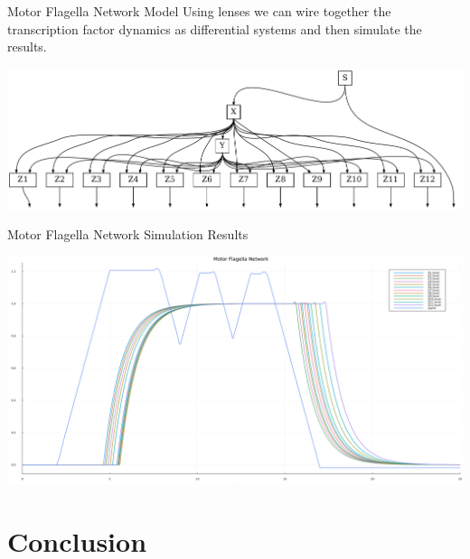 \documentclass{beamer}
\begin{document}
\begin{frame}{Motor Flagella Network Model}
    Using lenses we can wire together the transcription factor dynamics as differential systems and then simulate the results.

    \begin{center}
        \includegraphics[scale=0.35]{motor_flagella_network.png}
    \end{center}

\end{frame}

\begin{frame}{Motor Flagella Network Simulation Results}

    \begin{center}
        \includegraphics[scale=0.20]{motor_flagella.png}
    \end{center}
\end{frame}


\section{Conclusion}
\end{document}
